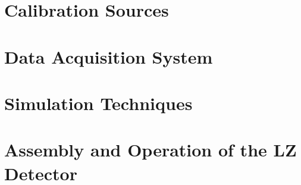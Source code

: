 \section{Calibration Sources}

\section{Data Acquisition System}

\section{Simulation Techniques}

\section{Assembly and Operation of the LZ Detector}